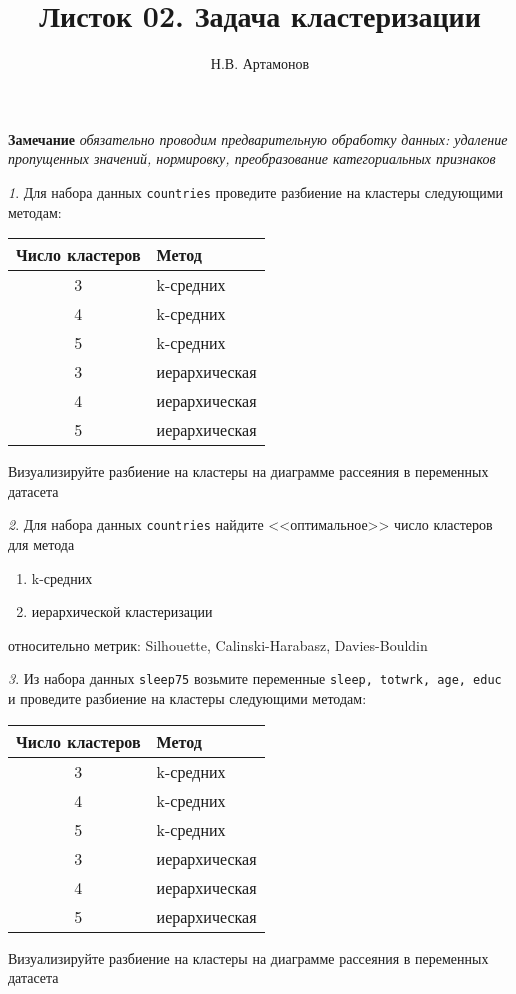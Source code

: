 \documentclass[12pt]{article}
\title{Листок 02. Задача кластеризации}
\author{Н.В. Артамонов}
\theoremstyle{remark}
\newtheorem{exercise}{}[section]
\begin{document}
\maketitle


\textbf{Замечание} \textit{обязательно проводим предварительную обработку данных:
удаление пропущенных значений, нормировку, преобразование категориальных признаков}

\begin{exercise}
Для набора данных \texttt{countries} проведите разбиение на кластеры следующими
методам:
\begin{center}
	\begin{tabular}{c|l}
		Число кластеров & Метод \\ \hline
		3 & k-средних \\
		4 & k-средних \\
		5 & k-средних \\
		3 & иерархическая \\
		4 & иерархическая \\
		5 & иерархическая \\ \hline
	\end{tabular}
\end{center}
Визуализируйте разбиение на кластеры на диаграмме рассеяния в переменных датасета
\end{exercise}

\begin{exercise}
Для набора данных \texttt{countries} найдите <<оптимальное>> число кластеров
для метода
\begin{enumerate}
	\item k-средних
	\item иерархической кластеризации
\end{enumerate}
относительно метрик: Silhouette, Calinski-Harabasz, Davies-Bouldin
\end{exercise}

\begin{exercise}
Из набора данных \texttt{sleep75} возьмите переменные 
\texttt{sleep, totwrk, age, educ} и проведите разбиение на кластеры следующими
методам:
\begin{center}
	\begin{tabular}{c|l}
		Число кластеров & Метод \\ \hline
		3 & k-средних \\
		4 & k-средних \\
		5 & k-средних \\
		3 & иерархическая \\
		4 & иерархическая \\
		5 & иерархическая \\ \hline
	\end{tabular}
\end{center}
Визуализируйте разбиение на кластеры на диаграмме рассеяния в переменных датасета
\end{exercise}
	
\end{document}
